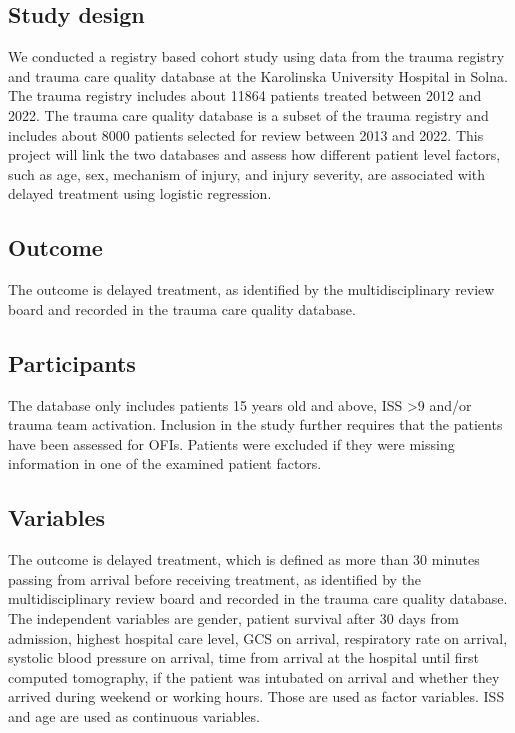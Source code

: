 \documentclass[
]{article}
\begin{document}
\hypertarget{study-design}{%
\subsection{Study design}\label{study-design}}

We conducted a registry based cohort study using data from the trauma
registry and trauma care quality database at the Karolinska University
Hospital in Solna. The trauma registry includes about 11864 patients
treated between 2012 and 2022. The trauma care quality database is a
subset of the trauma registry and includes about 8000 patients selected
for review between 2013 and 2022. This project will link the two
databases and assess how different patient level factors, such as age,
sex, mechanism of injury, and injury severity, are associated with
delayed treatment using logistic regression.

\hypertarget{outcome}{%
\subsection{Outcome}\label{outcome}}

The outcome is delayed treatment, as identified by the multidisciplinary
review board and recorded in the trauma care quality database.

\hypertarget{participants}{%
\subsection{Participants}\label{participants}}

The database only includes patients 15 years old and above, ISS
\textgreater9 and/or trauma team activation. Inclusion in the study
further requires that the patients have been assessed for OFIs. Patients
were excluded if they were missing information in one of the examined
patient factors.

\hypertarget{variables}{%
\subsection{Variables}\label{variables}}

The outcome is delayed treatment, which is defined as more than 30
minutes passing from arrival before receiving treatment, as identified
by the multidisciplinary review board and recorded in the trauma care
quality database. The independent variables are gender, patient survival
after 30 days from admission, highest hospital care level, GCS on
arrival, respiratory rate on arrival, systolic blood pressure on
arrival, time from arrival at the hospital until first computed
tomography, if the patient was intubated on arrival and whether they
arrived during weekend or working hours. Those are used as factor
variables. ISS and age are used as continuous variables.
\end{document}
